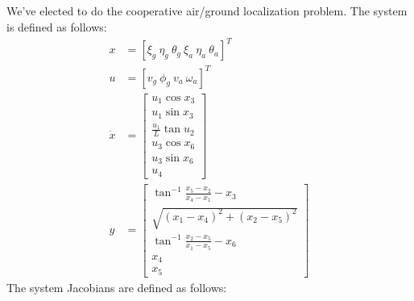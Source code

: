 \documentclass[11pt]{article}
\begin{document}
\subparagraph*{}
We've elected to do the cooperative air/ground localization problem. The system is defined as follows:
\begin{align*}
    x &= [\xi_g\ \eta_g\ \theta_g\ \xi_a\ \eta_a\ \theta_a]^T \\
    u &= [v_g\ \phi_g\ v_a\ \omega_a]^T \\
    \dot{x} &= \begin{bmatrix} u_1\cos x_3 \\ u_1\sin x_3 \\ \frac{u_1}{L}\tan u_2 \\ u_3 \cos x_6 \\ u_3 \sin x_6 \\ u_4 \end{bmatrix} \\
    y &= \begin{bmatrix} \tan^{-1}\frac{x_5-x_2}{x_4-x_1}-x_3 \\ \sqrt{(x_1-x_4)^2+(x_2-x_5)^2} \\ \tan^{-1}\frac{x_2-x_5}{x_1-x_5}-x_6 \\ x_4 \\ x_5 \end{bmatrix}
\end{align*}
The system Jacobians are defined as follows:
\end{document}

